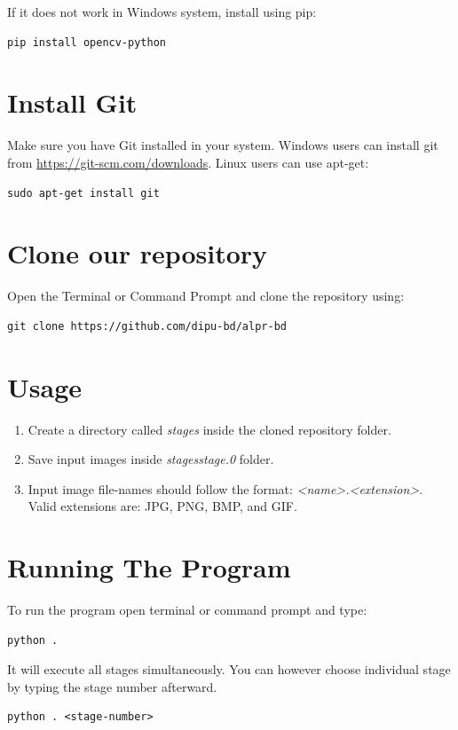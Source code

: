 If it does not work in Windows system, install using pip: 
\begin{lstlisting}
pip install opencv-python
\end{lstlisting}


\section{Install Git} 
Make sure you have Git installed in your system.
Windows users can install git from \url{https://git-scm.com/downloads}.
Linux users can use apt-get: 
\begin{lstlisting}
sudo apt-get install git
\end{lstlisting}


\section{Clone our repository}
Open the Terminal or Command Prompt and clone the repository using:
\begin{lstlisting}
git clone https://github.com/dipu-bd/alpr-bd
\end{lstlisting}

\section{Usage}
\begin{enumerate}
    \item Create a directory called {\it stages} inside the cloned repository folder.
    \item Save input images inside {\it stages\/stage.0} folder.
    \item Input image file-names should follow the format: {\it <name>.<extension>}. Valid extensions are: JPG, PNG, BMP, and GIF.
\end{enumerate}

\section{Running The Program}
To run the program open terminal or command prompt and type:
\begin{lstlisting}
python .
\end{lstlisting}

It will execute all stages simultaneously. You can however choose individual stage by typing the stage number afterward.
\begin{lstlisting}
python . <stage-number>
\end{lstlisting}

